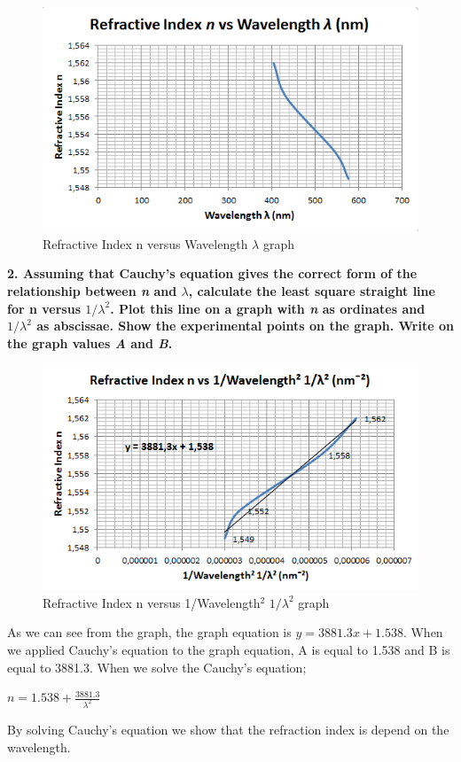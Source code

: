 \documentclass[a4paper,12pt]{report}
\begin{document}
\begin{figure}[h]
\centering
\includegraphics[width=1.0\linewidth, height=0.4\textheight]{graph1st}
\caption{Refractive Index n versus Wavelength $\lambda$ graph}
\label{fig:graph1st}
\end{figure}

\textbf{2. Assuming that Cauchy's equation gives the correct form of the relationship between \textit{n} and $\lambda$, calculate the least square straight line for n versus $1/\lambda^{2}$. Plot this line on a graph with \textit{n} as ordinates and $1/\lambda^{2}$ as abscissae. Show the experimental points on the graph. Write on the graph values \textit{A} and \textit{B}.}
\newpage
\begin{figure}[h]
\centering
\includegraphics[width=1.0\linewidth, height=0.4\textheight]{graph2new}
\caption{Refractive Index n versus 1/Wavelength$^{2}$ $1/\lambda^{2}$ graph}
\label{fig:graph2new}
\end{figure}
As we can see from the graph, the graph equation is $y=3881.3x+1.538$. When we applied Cauchy's equation to the graph equation, A is equal to 1.538 and B is equal to 3881.3. When we solve the Cauchy's equation;
\begin{center}
	{\large $n=1.538+\frac{3881.3}{\lambda^{2}}$}   
\end{center}
By solving Cauchy's equation we show that the refraction index is depend on the wavelength.
\end{document}
